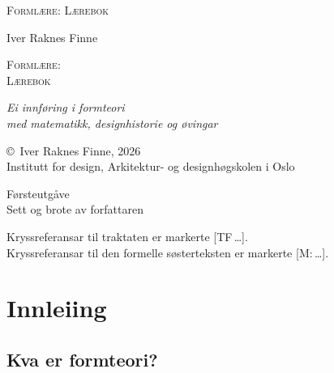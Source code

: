 \documentclass[10pt]{book}
\renewcommand{\footnotesize}{\fontsize{8pt}{10pt}\selectfont}
\renewcommand{\small}{\fontsize{9pt}{11pt}\selectfont}
\renewcommand{\normalsize}{\fontsize{10.5pt}{13pt}\selectfont}
\theoremstyle{definition}
\theoremstyle{plain}
\theoremstyle{remark}
\newcommand{\TF}[1]{\textnormal{[TF\,#1]}}
\newcommand{\Mref}[1]{\textnormal{[M:\,#1]}}
\begin{document}
\thispagestyle{empty}
\vspace*{5cm}
\begin{center}
{\fontsize{14pt}{17pt}\selectfont\scshape Forml\ae re: L\ae rebok}
\end{center}
\newpage

\thispagestyle{empty}
\vspace*{3cm}
\begin{center}
{\normalsize Iver Raknes Finne}

\vspace{1.5cm}
{\fontsize{22pt}{26pt}\selectfont\scshape Forml\ae re:\\[6pt]
L\ae rebok}

\vspace{0.6cm}
{\normalsize\itshape Ei innf\o ring i formteori\\[3pt]
med matematikk, designhistorie og \o vingar}
\end{center}
\vfill
\begin{center}
{\small 2026}
\end{center}
\newpage

\thispagestyle{empty}
\vspace*{\fill}
{\footnotesize
\copyright\ Iver Raknes Finne, 2026\\
Institutt for design, Arkitektur- og designh\o gskolen i Oslo

\medskip
F\o rsteutg\aa ve\\
Sett og brote av forfattaren

\medskip
Kryssreferansar til traktaten er markerte \TF{\ldots}.\\
Kryssreferansar til den formelle s\o sterteksten er markerte \Mref{\ldots}.}
\newpage

\tableofcontents
\newpage


\chapter*{Innleiing}

\section*{Kva er formteori?}
\end{document}
